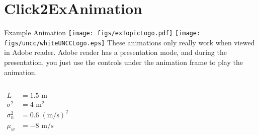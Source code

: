 
\section{Click2ExAnimation}
\begin{frame}{Example Animation \hfill \texttt{[image: figs/exTopicLogo.pdf]} \;\;\;\;\; \texttt{[image: figs/uncc/whiteUNCCLogo.eps]}}
    These animations only really work when viewed in Adobe reader.  Adobe reader has a presentation mode, and during the presentation, you just use the controls under the animation frame to play the animation.

    \begin{columns}[T,onlytextwidth]
            \begin{align*}
                L &= 1.5 \text{ m} \\
                \sigma^{2} &= 4 \text{ m}^{2}\\
                \sigma_{n}^{2} &= 0.6 \; (\text{m/s})^{2} \\
                \mu_{w} &= -8 \text{ m/s}
            \end{align*}
    \end{columns}
\end{frame}
